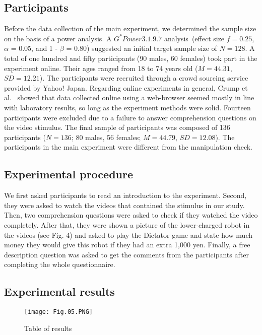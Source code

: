 \documentclass[runningheads]{llncs}
\begin{document}
\subsection{Participants}
Before the data collection of the main experiment, we determined the sample size on the basis of a power analysis. A $G^\ast Power 3.1.9.7$ analysis~\cite{ref_article21}(effect size $f = 0.25$, $\alpha$ = 0.05, and 1 - $\beta$ = 0.80) suggested an initial target sample size of $N = 128$. A total of one hundred and fifty participants (90 males, 60 females) took part in the experiment online. Their ages ranged from 18 to 74 years old ($M = 44.31$, $SD = 12.21$). The participants were recruited through a crowd sourcing service provided by Yahoo! Japan. Regarding online experiments in general, Crump et al.~\cite{ref_article20} showed that data collected online using a web-browser seemed mostly in line with laboratory results, so long as the experiment methods were solid. Fourteen participants were excluded due to a failure to answer comprehension questions on the video stimulus. The final sample of participants was composed of 136 participants ($N = 136$; 80 males, 56 females; $M=44.79$, $SD=12.08$). The participants in the main experiment were different from the manipulation check.


\subsection{Experimental procedure}
We first asked participants to read an introduction to the experiment. Second, they were asked to watch the videos that contained the stimulus in our study. Then, two comprehension questions were asked to check if they watched the video completely. After that, they were shown a picture of the lower-charged robot in the videos (see Fig. 4) and asked to play the Dictator game and state how much money they would give this robot if they had an extra 1,000 yen. Finally, a free description question was asked to get the comments from the participants after completing the whole questionnaire.




\subsection{Experimental results}

\begin{figure}[tb]
\centering
\texttt{[image: Fig.05.PNG]}
\caption{Table of results} \label{fig5}
\end{figure}
\end{document}
